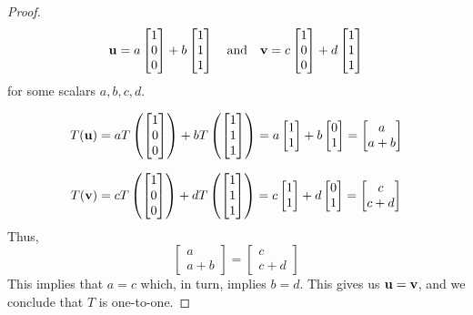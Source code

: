 \documentclass{ximera}
\renewcommand{\vec}[1]{{\bf #1}}
\begin{document}
\begin{example}
\begin{proof}
$$\vec{u}=a\begin{bmatrix}1\\0\\0\end{bmatrix}+b\begin{bmatrix}1\\1\\1\end{bmatrix}\quad\text{and}\quad \vec{v}=c\begin{bmatrix}1\\0\\0\end{bmatrix}+d\begin{bmatrix}1\\1\\1\end{bmatrix}$$
for some scalars $a, b, c, d$.

$$T(\vec{u})=aT\left(\begin{bmatrix}1\\0\\0\end{bmatrix}\right)+bT\left(\begin{bmatrix}1\\1\\1\end{bmatrix}\right)=a\begin{bmatrix}1\\1\end{bmatrix}+b\begin{bmatrix}0\\1\end{bmatrix}=\begin{bmatrix}a\\a+b\end{bmatrix}$$

$$T(\vec{v})=cT\left(\begin{bmatrix}1\\0\\0\end{bmatrix}\right)+dT\left(\begin{bmatrix}1\\1\\1\end{bmatrix}\right)=c\begin{bmatrix}1\\1\end{bmatrix}+d\begin{bmatrix}0\\1\end{bmatrix}=\begin{bmatrix}c\\c+d\end{bmatrix}$$
Thus,
$$\begin{bmatrix}a\\a+b\end{bmatrix}=\begin{bmatrix}c\\c+d\end{bmatrix}$$
This implies that $a=c$ which, in turn, implies $b=d$.  This gives us $\vec{u}=\vec{v}$, and we conclude that $T$ is one-to-one.


\end{proof}
\end{example}
\end{document}
